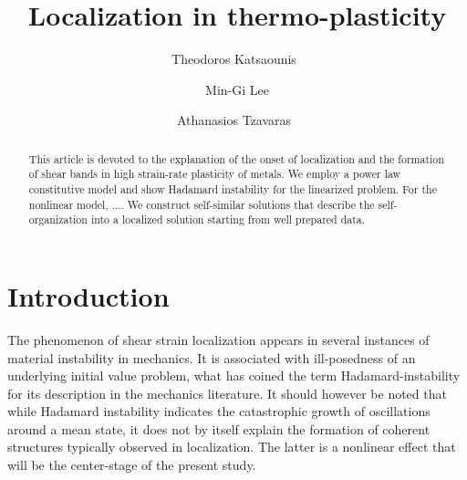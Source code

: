 \documentclass[a4paper,11pt]{article}
\theoremstyle{remark}
\begin{document}
\title{Localization in thermo-plasticity}
\author{Theodoros Katsaounis\footnotemark[1]\ \footnotemark[2]
\and Min-Gi Lee\footnotemark[1]
\and Athanasios Tzavaras\footnotemark[1]\  \footnotemark[2]  \footnotemark[3]}
\date{}

\maketitle
\renewcommand{\thefootnote}{\fnsymbol{footnote}}
\renewcommand{\thefootnote}{\arabic{footnote}}
\begin{abstract}
This article is devoted to the explanation of
the onset of localization and the formation of shear bands in high strain-rate plasticity of metals.
We employ a power law constitutive model and show Hadamard instability for the
linearized problem. For the nonlinear model,  ....  We construct self-similar solutions that describe
the self-organization into a localized solution starting from well prepared data.
\end{abstract}

\section{Introduction}




The phenomenon of shear strain localization appears in several instances of material instability in mechanics. It is associated with ill-posedness of an underlying initial value problem,
what has coined the term  Hadamard-instability for its description in the mechanics literature.
It should however be noted that
while Hadamard instability indicates the catastrophic growth of oscillations around a mean state,
it does not by itself explain the formation of coherent structures typically observed in localization.
The latter is a nonlinear effect that will be the center-stage of the present study.
\end{document}

